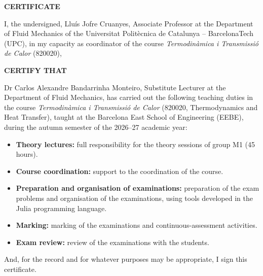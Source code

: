 \documentclass[11pt]{article}
\begin{document}
\makeatletter\certheader\makeatother

\begin{center}
  {\Large\bfseries CERTIFICATE}
\end{center}

I, the undersigned, Llu\'is Jofre Cruanyes, Associate Professor at the Department of
Fluid Mechanics of the Universitat Polit\`ecnica de Catalunya -- BarcelonaTech (UPC),
in my capacity as coordinator of the course
\emph{Termodin\`amica i Transmissi\'o de Calor} (820020),

\textbf{CERTIFY THAT}

Dr Carlos Alexandre Bandarrinha Monteiro, Substitute Lecturer at the Department of
Fluid Mechanics, has carried out the following teaching duties in the course
\emph{Termodin\`amica i Transmissi\'o de Calor} (820020, Thermodynamics and Heat
Transfer), taught at the Barcelona East School of Engineering (EEBE), during the autumn
semester of the 2026--27 academic year:

\begin{itemize}[leftmargin=1.5em,itemsep=0.3em]
  \item \textbf{Theory lectures:} full responsibility for the theory sessions of group M1
        (45 hours).
  \item \textbf{Course coordination:} support to the coordination of the course.
  \item \textbf{Preparation and organisation of examinations:} preparation of the exam
        problems and organisation of the examinations, using tools developed in the Julia
        programming language.
  \item \textbf{Marking:} marking of the examinations and continuous-assessment activities.
  \item \textbf{Exam review:} review of the examinations with the students.
\end{itemize}

And, for the record and for whatever purposes may be appropriate, I sign this
certificate.

\makeatletter
{}
\makeatother
\end{document}
